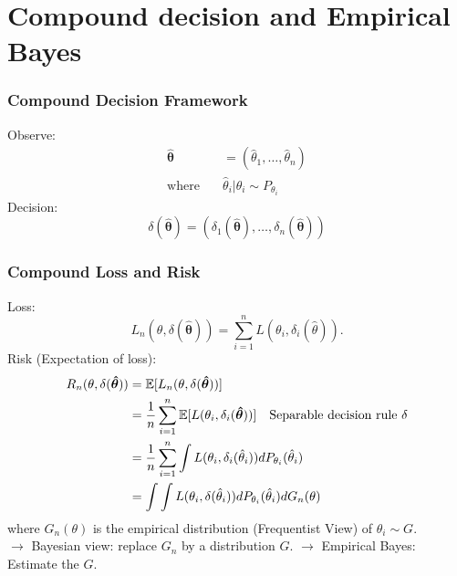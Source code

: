 \documentclass[10pt,mathserif,aspectratio=169]{beamer}
\begin{document}
\section{Compound decision and Empirical Bayes}

\begin{frame}
  \frametitle{Compound Decision Framework}
  Observe:
  \begin{align*}
    \boldsymbol{\hat{\theta}} & =  (\hat{\theta}_1,\ldots, \hat{\theta}_n)  \\
    \text{where} \quad        & \hat{\theta}_i | \theta_i \sim P_{\theta_i}
  \end{align*}
  Decision:
  \begin{equation*}
    \delta(\boldsymbol{\hat{\theta}}) = (\delta_1(\boldsymbol{\hat{\theta}}), \ldots, \delta_n(\boldsymbol{\hat{\theta}}))
  \end{equation*}
\end{frame}

\begin{frame}
  \frametitle{Compound Loss and Risk}
  Loss:
  \begin{equation*}
    L_n(\theta, \delta(\boldsymbol{\hat{\theta}})) = \sum_{i=1}^n L(\theta_i, \delta_i(\hat{\theta})).
  \end{equation*}
  Risk (Expectation of loss):
  \begin{align*}
    R_n(\theta, \delta(\boldsymbol{\hat{\theta}})) & = \mathbb{E}[L_n(\theta, \delta(\boldsymbol{\hat{\theta}}))]                                                                                \\
                                                   & = \frac{1}{n}\sum_{i=1}^n \mathbb{E}[L(\theta_i, \delta_i(\boldsymbol{\hat{\theta}}))]         \quad \text{Separable decision rule } \delta \\
                                                   & = \frac{1}{n}\sum_{i=1}^n \int L(\theta_i, \delta_i(\hat{\theta}_i))dP_{\theta_i}(\hat{\theta}_i)                                   \\
                                                   & = \int \int L(\theta_i, \delta(\hat{\theta}_i))dP_{\theta_i}(\hat{\theta}_i)dG_n(\theta)
  \end{align*}
  where $G_n(\theta)$ is the empirical distribution (Frequentist View) of $\theta_i \sim G$.
  \\$\rightarrow$ Bayesian view: replace $G_n$ by a distribution $G$. $\rightarrow$ Empirical Bayes: Estimate the $G$.
\end{frame}
\end{document}

